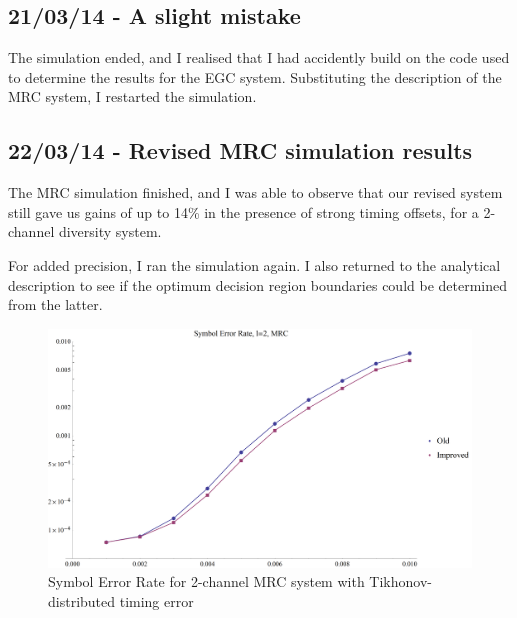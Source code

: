 \subsection{21/03/14 - A slight mistake}

The simulation ended, and I realised that I had accidently build on the
code used to determine the results for the EGC system. Substituting the
description of the MRC system, I restarted the simulation.

\subsection{22/03/14 - Revised MRC simulation results}

The MRC simulation finished, and I was able to observe that our revised
system still gave us gains of up to 14\% in the presence of strong
timing offsets, for a 2-channel diversity system.

For added precision, I ran the simulation again. I also returned to the
analytical description to see if the optimum decision region boundaries
could be determined from the latter.

\begin{figure}[htbp]
\centering
\includegraphics[width=\linewidth]{../../../plots/MRC_SER.png}
\caption{Symbol Error Rate for 2-channel MRC system with
Tikhonov-distributed timing error}
\end{figure}